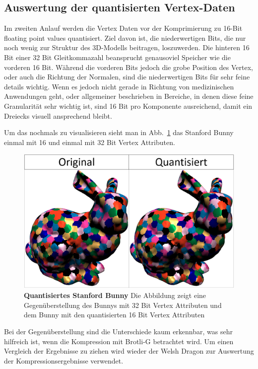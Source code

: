 \subsection{Auswertung der quantisierten Vertex-Daten}
\label{subsec:auswertung2}
Im zweiten Anlauf werden die Vertex Daten vor der Komprimierung zu 16-Bit floating point values quantisiert.
Ziel davon ist, die niederwertigen Bits, die nur noch wenig zur Struktur des 3D-Modells beitragen, loszuwerden.
Die hinteren 16 Bit einer 32 Bit Gleitkommazahl beansprucht genausoviel Speicher wie die vorderen 16 Bit.
Während die vorderen Bits jedoch die grobe Position des Vertex, oder auch die Richtung der Normalen, sind die niederwertigen Bits für sehr feine details wichtig.
Wenn es jedoch nicht gerade in Richtung von medizinischen Anwendungen geht, oder allgemeiner beschrieben in Bereiche, in denen diese feine Granularität sehr wichtig ist, sind 16 Bit pro Komponente ausreichend, damit ein Dreiecks visuell ansprechend bleibt. \newline

Um das nochmals zu visualisieren sieht man in Abb.~\ref{fig:bunny} das Stanford Bunny einmal mit 16 und einmal mit 32 Bit Vertex Attributen.

\begin{figure}[htb]
  \centering  
  \includegraphics[scale=0.45]{Bilder/bunny_quantisiert.png}
  \caption[Quantisiertes Stanford Bunny]{\textbf{Quantisiertes Stanford Bunny} Die Abbildung zeigt eine Gegenüberstellung des Bunnys mit 32 Bit Vertex Attributen und dem Bunny mit den quantisierten 16 Bit Vertex Attributen }
  \label{fig:bunny}
\end{figure}

Bei der Gegenüberstellung sind die Unterschiede kaum erkennbar, was sehr hilfreich ist, wenn die Kompression mit Brotli-G betrachtet wird.
Um einen Vergleich der Ergebnisse zu ziehen wird wieder der Welsh Dragon zur Auswertung der Kompressionsergebnisse verwendet.


